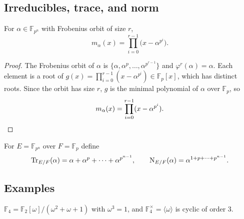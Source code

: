 \subsection{Irreducibles, trace, and norm}
\begin{proposition}
For $\alpha\in\mathbb{F}_{p^n}$ with Frobenius orbit of size $r$,
\[
m_\alpha(x)=\prod_{i=0}^{r-1}\bigl(x-\alpha^{p^i}\bigr).
\]
\end{proposition}
\begin{proof}
The Frobenius orbit of $\alpha$ is $\{\alpha,\alpha^p,\ldots,\alpha^{p^{r-1}}\}$ and $\varphi^r(\alpha)=\alpha$. Each element is a root of $g(x)=\prod_{i=0}^{r-1}(x-\alpha^{p^i})\in\mathbb{F}_p[x]$, which has distinct roots. Since the orbit has size $r$, $g$ is the minimal polynomial of $\alpha$ over $\mathbb{F}_p$, so
\[
m_\alpha(x)=\prod_{i=0}^{r-1}(x-\alpha^{p^i}).\qedhere
\]
\end{proof}
\begin{definition}
For $E=\mathbb{F}_{p^n}$ over $F=\mathbb{F}_p$ define
\[
\operatorname{Tr}_{E/F}(\alpha)=\alpha+\alpha^p+\cdots+\alpha^{p^{n-1}},\qquad
\operatorname{N}_{E/F}(\alpha)=\alpha^{1+p+\cdots+p^{n-1}}.
\]
\end{definition}

\subsection{Examples}
\begin{example}
$\mathbb{F}_4=\mathbb{F}_2[\omega]/(\omega^2+\omega+1)$ with $\omega^3=1$, and $\mathbb{F}_4^\times=\langle\omega\rangle$ is cyclic of order $3$.
\end{example}
